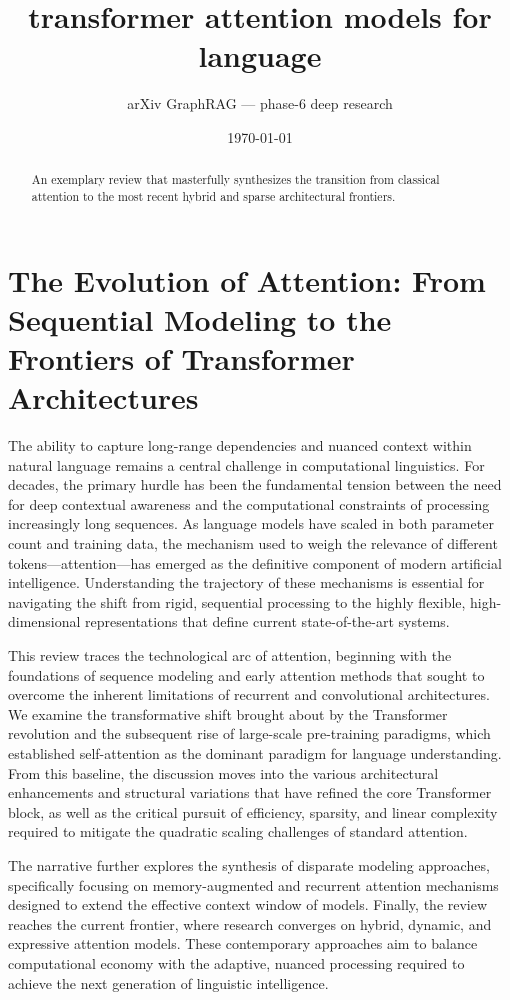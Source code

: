 \documentclass[11pt]{article}
\title{transformer attention models for language}
\author{arXiv GraphRAG --- phase-6 deep research}
\date{\today}
\begin{document}
\maketitle

\begin{abstract}
An exemplary review that masterfully synthesizes the transition from classical attention to the most recent hybrid and sparse architectural frontiers.
\end{abstract}

\section{The Evolution of Attention: From Sequential Modeling to the Frontiers of Transformer Architectures}

The ability to capture long-range dependencies and nuanced context within natural language remains a central challenge in computational linguistics. For decades, the primary hurdle has been the fundamental tension between the need for deep contextual awareness and the computational constraints of processing increasingly long sequences. As language models have scaled in both parameter count and training data, the mechanism used to weigh the relevance of different tokens—attention—has emerged as the definitive component of modern artificial intelligence. Understanding the trajectory of these mechanisms is essential for navigating the shift from rigid, sequential processing to the highly flexible, high-dimensional representations that define current state-of-the-art systems.

This review traces the technological arc of attention, beginning with the foundations of sequence modeling and early attention methods that sought to overcome the inherent limitations of recurrent and convolutional architectures. We examine the transformative shift brought about by the Transformer revolution and the subsequent rise of large-scale pre-training paradigms, which established self-attention as the dominant paradigm for language understanding. From this baseline, the discussion moves into the various architectural enhancements and structural variations that have refined the core Transformer block, as well as the critical pursuit of efficiency, sparsity, and linear complexity required to mitigate the quadratic scaling challenges of standard attention.

The narrative further explores the synthesis of disparate modeling approaches, specifically focusing on memory-augmented and recurrent attention mechanisms designed to extend the effective context window of models. Finally, the review reaches the current frontier, where research converges on hybrid, dynamic, and expressive attention models. These contemporary approaches aim to balance computational economy with the adaptive, nuanced processing required to achieve the next generation of linguistic intelligence.
\end{document}
